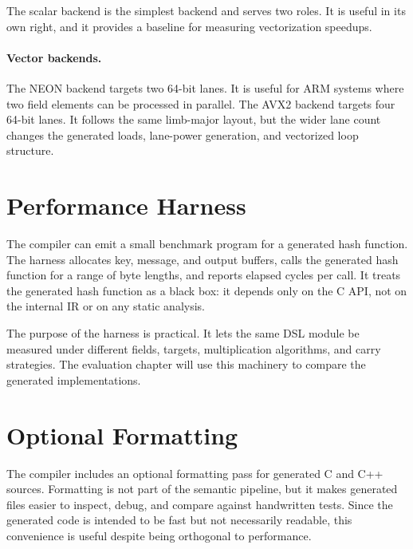 The scalar backend is the simplest backend and serves two roles. It is useful in its own right, and it provides a baseline for measuring vectorization speedups.

\paragraph{Vector backends.}
The NEON backend targets two 64-bit lanes. It is useful for ARM systems where two field elements can be processed in parallel. The AVX2 backend targets four 64-bit lanes. It follows the same limb-major layout, but the wider lane count changes the generated loads, lane-power generation, and vectorized loop structure.

\section{Performance Harness}
\label{sec:performance-harness}

The compiler can emit a small benchmark program for a generated hash function. The harness allocates key, message, and output buffers, calls the generated hash function for a range of byte lengths, and reports elapsed cycles per call. It treats the generated hash function as a black box: it depends only on the C API, not on the internal IR or on any static analysis.

The purpose of the harness is practical. It lets the same DSL module be measured under different fields, targets, multiplication algorithms, and carry strategies. The evaluation chapter will use this machinery to compare the generated implementations.

\section{Optional Formatting}
\label{sec:optional-formatting}

The compiler includes an optional formatting pass for generated C and C++ sources. Formatting is not part of the semantic pipeline, but it makes generated files easier to inspect, debug, and compare against handwritten tests. Since the generated code is intended to be fast but not necessarily readable, this convenience is useful despite being orthogonal to performance.
